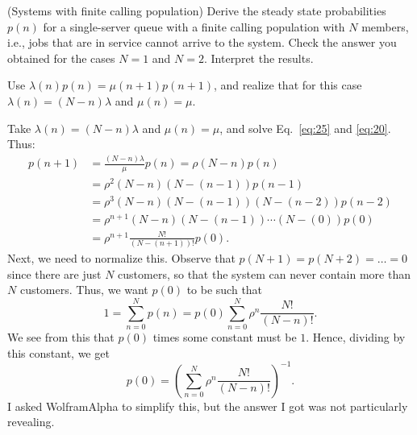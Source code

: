 \begin{comment}
It must be because the model of Problem 21 assumes that the number of
available servers is unlimited. Hence, any time the queue up-crosses the
threshold $K=2$, an extra server is called. Thus, even though in
both cases the number of busy servers is 2, (i.e., $B\approx 2$
here, and two servers (the M/M/2 queue ) in Problem 11), more server
capacity can be added during busy times under the threshold policy
than under the policy with a fixed number of servers (i.e., the M/M/2
queue).

  \end{solution}
\end{exercise}
\end{comment}


\begin{exercise}(Systems with finite calling population)
 Derive the steady state probabilities $p(n)$ for a
    single-server queue with a finite calling population with $N$
    members, i.e., jobs that are in service cannot arrive to the system.
 Check the answer you obtained for the cases $N=1$ and
    $N=2$. Interpret the results.
  \begin{hint}
Use $\lambda(n) p(n) = \mu(n+1)p(n+1)$, and realize that for
      this case $\lambda(n) = (N-n)\lambda$ and $\mu(n) = \mu$.
  \end{hint}
    \begin{solution}
 Take $\lambda(n) = (N-n)\lambda$ and $\mu(n) = \mu$, and solve
    Eq.~\eqref{eq:25} and \eqref{eq:20}.  Thus: 
    \begin{align*}
       p(n+1) 
& = \frac{(N-n)\lambda}\mu p(n) 
 = \rho (N-n) p(n) \\
& = \rho^2 (N-n)(N-(n-1))p(n-1) \\
& = \rho^3 (N-n)(N-(n-1))(N-(n-2)) p(n-2) \\
& = \rho^{n+1} (N-n)(N-(n-1))\cdots(N-(0)) p(0) \\
&= \rho^{n+1} \frac{N!}{(N-(n+1))!}p(0). 
    \end{align*}
    Next, we need to normalize this. Observe that
    $p(N+1)=p(N+2) = \ldots = 0$ since there are just $N$ customers,
    so that the system can never contain more than $N$
    customers. Thus, we want $p(0)$ to be such that
\begin{equation*}
  1 = \sum_{n=0}^N p(n) = p(0) \sum_{n=0}^N \rho^n \frac{N!}{(N-n)!}.
\end{equation*}
We see from this that $p(0)$ times some constant must be $1$. Hence, dividing by this constant, we get 
\begin{equation*}
  p(0) = \left(\sum_{n=0}^N \rho^n \frac{N!}{(N-n)!}\right)^{-1}.
\end{equation*}
I asked WolframAlpha to simplify this, but the answer I got was not particularly revealing. 
    \end{solution}
\end{exercise}

